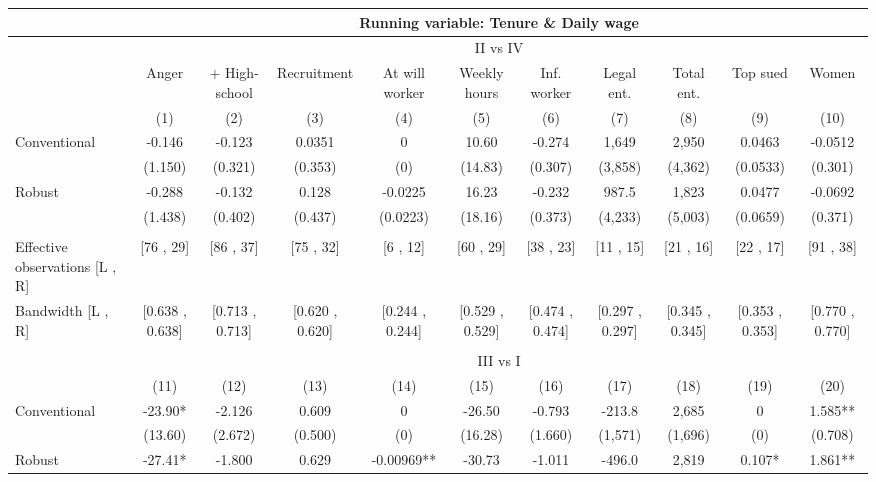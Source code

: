 \begin{tabular}{lcccccccccc}
\toprule
      & \multicolumn{10}{c}{Running variable: Tenure \& Daily wage} \\
\midrule
      & \multicolumn{10}{c}{II vs IV} \\
\midrule
\midrule
      & Anger & + High-school & Recruitment & At will worker & Weekly hours & Inf. worker & Legal ent. & Total ent. & Top sued & Women \\
\midrule
      & (1)   & (2)   & (3)   & (4)   & (5)   & (6)   & (7)   & (8)   & (9)   & (10) \\
\midrule
\midrule
Conventional & -0.146 & -0.123 & 0.0351 & 0     & 10.60 & -0.274 & 1,649 & 2,950 & 0.0463 & -0.0512 \\
      & (1.150) & (0.321) & (0.353) & (0)   & (14.83) & (0.307) & (3,858) & (4,362) & (0.0533) & (0.301) \\
Robust & -0.288 & -0.132 & 0.128 & -0.0225 & 16.23 & -0.232 & 987.5 & 1,823 & 0.0477 & -0.0692 \\
      & (1.438) & (0.402) & (0.437) & (0.0223) & (18.16) & (0.373) & (4,233) & (5,003) & (0.0659) & (0.371) \\
      &       &       &       &       &       &       &       &       &       &  \\
\midrule
Effective observations [L , R] & [76 , 29] & [86 , 37] & [75 , 32] & [6 , 12] & [60 , 29] & [38 , 23] & [11 , 15] & [21 , 16] & [22 , 17] & [91 , 38] \\
Bandwidth [L , R] & [0.638 , 0.638] & [0.713 , 0.713] & [0.620 , 0.620] & [0.244 , 0.244] & [0.529 , 0.529] & [0.474 , 0.474] & [0.297 , 0.297] & [0.345 , 0.345] & [0.353 , 0.353] & [0.770 , 0.770] \\
\midrule
\midrule
      &       &       &       &       &       &       &       &       &       &  \\
\midrule
      & \multicolumn{10}{c}{III vs I} \\
\midrule
\midrule
      & (11)  & (12)  & (13)  & (14)  & (15)  & (16)  & (17)  & (18)  & (19)  & (20) \\
\midrule
\midrule
Conventional & -23.90* & -2.126 & 0.609 & 0     & -26.50 & -0.793 & -213.8 & 2,685 & 0     & 1.585** \\
      & (13.60) & (2.672) & (0.500) & (0)   & (16.28) & (1.660) & (1,571) & (1,696) & (0)   & (0.708) \\
Robust & -27.41* & -1.800 & 0.629 & -0.00969** & -30.73 & -1.011 & -496.0 & 2,819 & 0.107* & 1.861** \\

\end{tabular}
